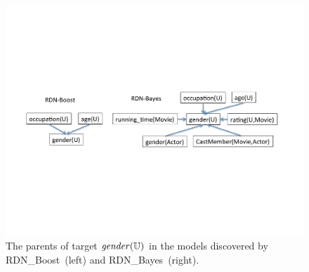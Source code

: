 \documentclass[runningheads,a4paper]{llncs}
\begin{document}
\begin{figure}[htbp]
\begin{center}
\includegraphics[width=1\textwidth]{dn-structure}
\caption{The parents of target $\it{gender}(\mathbb{U})$ in the models discovered by RDN\_Boost~(left) and RDN\_Bayes~(right). \label{fig:dn-structure}}
\end{center}
\end{figure}
%
\end{document}
